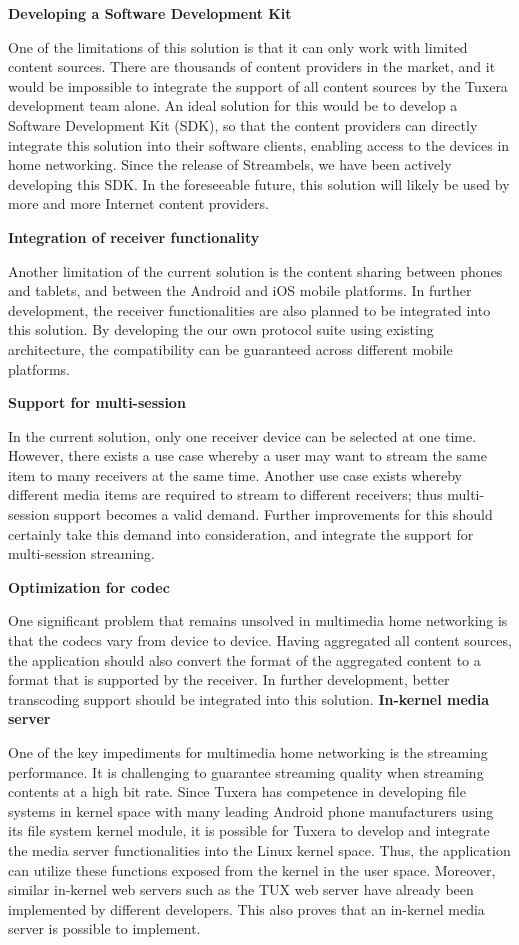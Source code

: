 \textbf{Developing a Software Development Kit}

One of the limitations of this solution is that it can only work with limited
content sources. There are thousands of content providers in the market, and it
would be impossible to integrate the support of all content sources by the
Tuxera development team alone. An ideal solution for this would be to develop a
Software Development Kit (SDK), so that the content providers can directly
integrate this solution into their software clients, enabling access to the
devices in home networking. Since the release of Streambels, we have been
actively developing this SDK. In the foreseeable future, this solution will
likely be used by more and more Internet content providers.

\textbf{Integration of receiver functionality}

Another limitation of the current solution is the content sharing between
phones and tablets, and between the Android and iOS mobile platforms.
In further development, the receiver functionalities are also planned to be
integrated into this solution. By developing the our own protocol suite using
existing architecture, the compatibility can be guaranteed across different
mobile platforms.

\textbf{Support for multi-session}

In the current solution, only one receiver device can be selected at one
time. However, there exists a use case whereby a user may want to stream the
same item to many receivers at the same time. Another use case exists
whereby different media items are required to stream to different receivers;
thus multi-session support becomes a valid demand. Further improvements
for this should certainly take this demand into consideration, and integrate the
support for multi-session streaming.

\textbf{Optimization for codec}

One significant problem that remains unsolved in multimedia home networking is
that the codecs vary from device to device. Having aggregated all content
sources, the application should also convert the format of the aggregated
content to a format that is supported by the receiver. In further development,
better transcoding support should be integrated into this solution.
\clearpage
\textbf{In-kernel media server}

One of the key impediments for multimedia home networking is the streaming
performance. It is challenging to guarantee streaming quality when streaming
contents at a high bit rate. Since Tuxera has competence in developing file
systems in kernel space with many leading Android phone manufacturers using its
file system kernel module, it is possible for Tuxera to develop and integrate
the media server functionalities into the Linux kernel space. Thus, the
application can utilize these functions exposed from the kernel in the user
space. Moreover, similar in-kernel web servers such as the TUX web server
\cite{tux_webserver} have already been implemented by different developers.
This also proves that an in-kernel media server is possible to implement.
